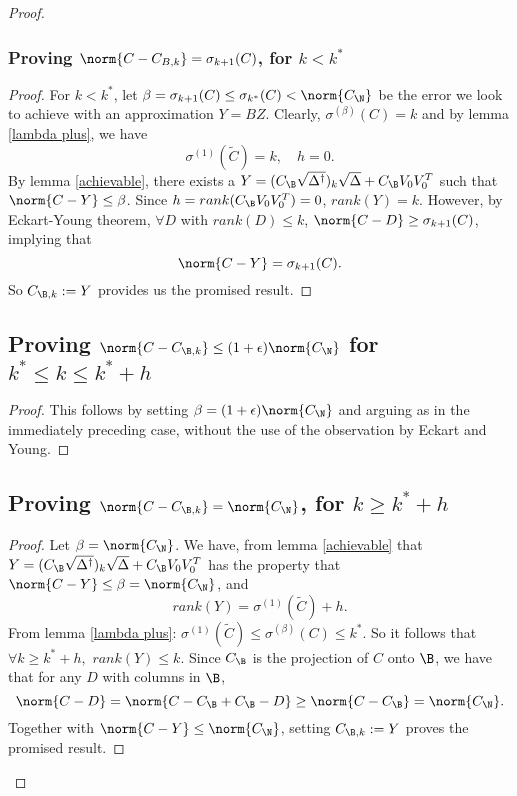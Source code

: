 \begin{proof}
\subsubsection{Proving $\norm{C - C_{B, k}} = \sigma_{k+1}(C)$, for $k < k^*$}
\begin{proof}
For $k < k^*$, let $\beta = \sigma_{k+1}(C) \leq \sigma_{k^*} (C) < \norm{C_{\N}}$ be the error we look to achieve with an approximation $Y = BZ$. Clearly, $\sigma^{(\beta)} (C) = k$ and by lemma \ref{lambda plus}, we have
\[ \sigma^{(1)}(\tilde{C}) = k, \quad h = 0. \]
By lemma \ref{achievable}, there exists a $Y=(C_{\B} \sqrt{\Delta^{\dagger}})_k \sqrt{\Delta} +C_{\B} V_0V_0^T$ such that $\norm{C - Y} \leq \beta$. Since $h = rank(C_{\B} V_0V_0^T) = 0$, $rank(Y) = k$. However, by Eckart-Young theorem, $\forall D$ with $rank(D) \leq k$, $\norm{C - D} \geq \sigma_{k+1} (C)$, implying that
\[ \norm{C - Y} = \sigma_{k+1}(C).\]
So $C_{\B, k} := Y$ provides us the promised result.
\end{proof}

\subsection{Proving $\norm{C - C_{\B, k}} \leq (1 + \epsilon) \norm{C_{\N}}$ for $k^* \leq k \leq k^* + h$}
\begin{proof}
This follows by setting $\beta = (1 + \epsilon)\norm{C_{\N}}$ and arguing as in the immediately preceding case, without the use of the observation by Eckart and Young.
\end{proof}

\subsection{Proving $\norm{C- C_{\B, k}} = \norm{C_{\N}}$, for $k \geq k^* + h$}
\begin{proof}
Let $\beta = \norm{C_{\N}}$. We have, from lemma \ref{achievable} that $Y = (C_{\B} \sqrt{\Delta^{\dagger}})_k \sqrt{\Delta} +C_{\B} V_0V_0^T$ has the property that $\norm{C - Y} \leq \beta = \norm{C_{\N}}$, and 
\[ rank(Y) = \sigma^{(1)}(\tilde{C}) + h. \]
From lemma \ref{lambda plus}: $\sigma^{(1)}(\tilde C) \leq \sigma^{(\beta)}(C) \leq k^*$. So it follows that $\forall k \geq k^* + h,$ $rank(Y) \leq k$. Since $C_{\B}$ is the projection of $C$ onto $\B$, we have that for any $D$ with columns in $\B$,
\[ \norm{C - D} = \norm{C - C_{\B} + C_{\B} - D} \geq \norm{C - C_{\B}} = \norm{C_{\N}}.\]
Together with $\norm{C - Y}  \leq \norm{C_{\N}}$, setting $C_{\B, k} := Y$ proves the promised result.
\end{proof}


\end{proof}
